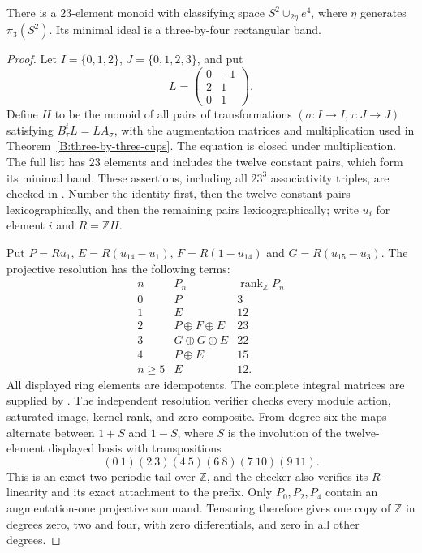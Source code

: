 \begin{proposition}
\label{B:even-hopf23}
There is a $23$-element monoid with classifying space
$S^2\cup_{2\eta}e^4$, where $\eta$ generates $\pi_3(S^2)$.
Its minimal ideal is a three-by-four rectangular band.
\end{proposition}
\begin{proof}
Let $I=\{0,1,2\}$, $J=\{0,1,2,3\}$, and put
\[
 L=\begin{pmatrix}0&-1\\2&1\\0&1\end{pmatrix}.
\]
Define $H$ to be the monoid of all pairs of transformations
$(\sigma:I\to I,\tau:J\to J)$ satisfying
$B_\tau^tL=LA_\sigma$, with the augmentation matrices and
multiplication used in Theorem~\ref{B:three-by-three-cups}.
The equation is closed under multiplication.  The full list has
$23$ elements and includes the twelve constant pairs, which form its
minimal band.  These assertions, including all $23^3$ associativity
triples, are checked in
.
Number the identity first, then the twelve constant pairs
lexicographically, and then the remaining pairs lexicographically;
write $u_i$ for element $i$ and $R=\mathbb ZH$.

Put $P=Ru_1$, $E=R(u_{14}-u_1)$, $F=R(1-u_{14})$ and
$G=R(u_{15}-u_3)$.  The projective resolution has the following terms:
\[
\begin{array}{c|c|r}
 n&P_n&\operatorname{rank}_{\mathbb Z}P_n\\\hline
0&P&3\\
1&E&12\\
2&P\oplus F\oplus E&23\\
3&G\oplus G\oplus E&22\\
4&P\oplus E&15\\
n\geq5&E&12.
\end{array}
\]
All displayed ring elements are idempotents.  The complete integral
matrices are supplied by
.
The independent resolution verifier checks every module action,
saturated image, kernel rank, and zero composite.  From degree six
the maps alternate between $1+S$ and $1-S$, where $S$ is the
involution of the twelve-element displayed basis with transpositions
\[
 (0\ 1)(2\ 3)(4\ 5)(6\ 8)(7\ 10)(9\ 11).
\]
This is an exact two-periodic tail over $\mathbb Z$, and the checker
also verifies its $R$-linearity and its exact attachment to the prefix.
Only $P_0,P_2,P_4$ contain an augmentation-one projective summand.
Tensoring therefore gives one copy of $\mathbb Z$ in degrees zero,
two and four, with zero differentials, and zero in all other degrees.


\end{proof}
